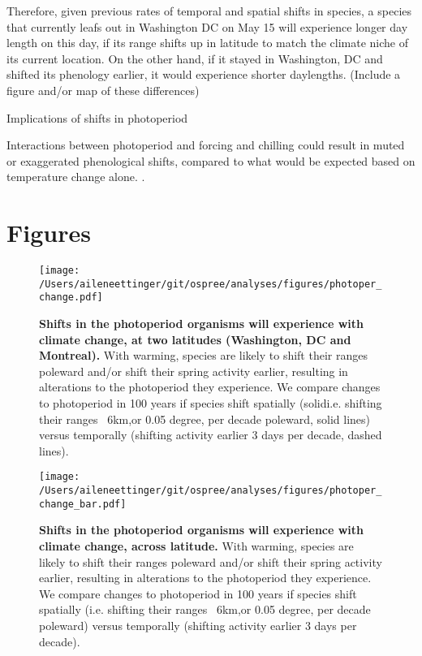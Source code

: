 \documentclass{article}
\begin{document}
    Therefore, given previous rates of temporal and spatial shifts in species, a species that currently leafs out in Washington DC on May 15 will experience longer day length on this day, if its range shifts up in latitude to match the climate niche of its current location. On the other hand, if it stayed in Washington, DC and shifted its phenology earlier, it would experience shorter daylengths. (Include a figure and/or map of these differences)

Implications of shifts in photoperiod

    Interactions between photoperiod and forcing and chilling could result in muted or exaggerated phenological shifts, compared to what would be expected based on temperature change alone.
. 
%
\clearpage

\section* {Figures}
\begin{figure}[p]
\centering
\texttt{[image: /Users/aileneettinger/git/ospree/analyses/figures/photoper\_change.pdf]} 
\caption{\textbf{Shifts in the photoperiod organisms will experience with climate change, at two latitudes (Washington, DC and Montreal).}  With warming, species are likely to shift their ranges poleward and/or shift their spring activity earlier, resulting in alterations to the photoperiod they experience. We compare changes to photoperiod in 100 years if species shift spatially (solidi.e. shifting their ranges ~6km,or 0.05 degree, per decade poleward, solid lines) versus temporally (shifting activity earlier 3 days per decade, dashed lines).}
 \label{fig:photo}
 \end{figure}
\begin{figure}[p]
\centering
\texttt{[image: /Users/aileneettinger/git/ospree/analyses/figures/photoper\_change\_bar.pdf]} 
\caption{\textbf{Shifts in the photoperiod organisms will experience with climate change, across latitude.}  With warming, species are likely to shift their ranges poleward and/or shift their spring activity earlier, resulting in alterations to the photoperiod they experience. We compare changes to photoperiod in 100 years if species shift spatially (i.e. shifting their ranges ~6km,or 0.05 degree, per decade poleward) versus temporally (shifting activity earlier 3 days per decade).}
 \label{fig:photo}
 \end{figure}
\clearpage



\end{document}
